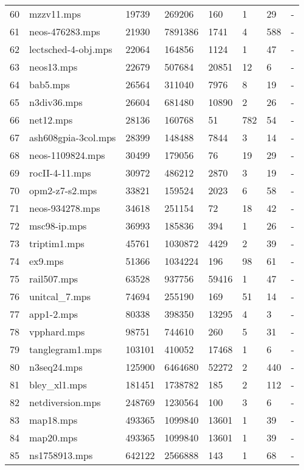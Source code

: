 \documentclass{article}
\begin{document}
\begin{longtable}{|l |l |l |l |l |l |l |l |}
60&mzzv11.mps&19739&269206&160&1&29&-\\
61&neos-476283.mps&21930&7891386&1741&4&588&-\\
62&lectsched-4-obj.mps&22064&164856&1124&1&47&-\\
63&neos13.mps&22679&507684&20851&12&6&-\\
64&bab5.mps&26564&311040&7976&8&19&-\\
65&n3div36.mps&26604&681480&10890&2&26&-\\
66&net12.mps&28136&160768&51&782&54&-\\
67&ash608gpia-3col.mps&28399&148488&7844&3&14&-\\
68&neos-1109824.mps&30499&179056&76&19&29&-\\
69&rocII-4-11.mps&30972&486212&2870&3&19&-\\
70&opm2-z7-s2.mps&33821&159524&2023&6&58&-\\
71&neos-934278.mps&34618&251154&72&18&42&-\\
72&msc98-ip.mps&36993&185836&394&1&26&-\\
73&triptim1.mps&45761&1030872&4429&2&39&-\\
74&ex9.mps&51366&1034224&196&98&61&-\\
75&rail507.mps&63528&937756&59416&1&47&-\\
76&unitcal_7.mps&74694&255190&169&51&14&-\\
77&app1-2.mps&80338&398350&13295&4&3&-\\
78&vpphard.mps&98751&744610&260&5&31&-\\
79&tanglegram1.mps&103101&410052&17468&1&6&-\\
80&n3seq24.mps&125900&6464680&52272&2&440&-\\
81&bley_xl1.mps&181451&1738782&185&2&112&-\\
82&netdiversion.mps&248769&1230564&100&3&6&-\\
83&map18.mps&493365&1099840&13601&1&39&-\\
84&map20.mps&493365&1099840&13601&1&39&-\\
85&ns1758913.mps&642122&2566888&143&1&68&-\\
\hline
\end{longtable}
\end{document}
